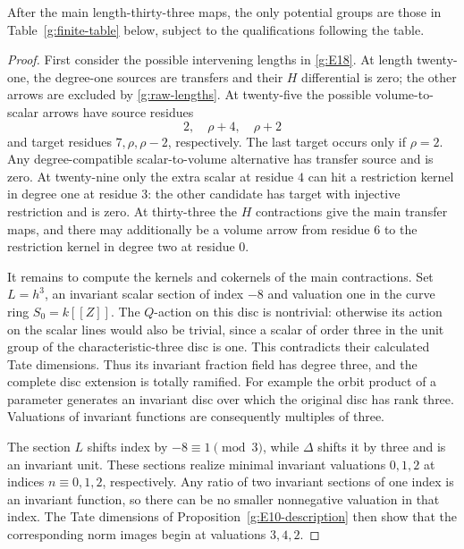 \begin{lemma}\label{g:to33}
After the main length-thirty-three maps, the only potential
groups are those in Table~\ref{g:finite-table} below, subject
to the qualifications following the table.
\end{lemma}

\begin{proof}
First consider the possible intervening lengths in
\eqref{g:E18}.  At length twenty-one, the degree-one sources
are transfers and their $H$ differential is zero; the
other arrows are excluded by \eqref{g:raw-lengths}.
At twenty-five the possible volume-to-scalar arrows have
source residues
\[
 2,\quad\rho+4,\quad\rho+2
\]
and target residues $7,\rho,\rho-2$, respectively.
The last target occurs only if $\rho=2$.  Any
degree-compatible scalar-to-volume alternative has
transfer source and is zero.  At twenty-nine only the
extra scalar at residue $4$ can hit a restriction kernel
in degree one at residue $3$: the other candidate has
target with injective restriction and is zero.  At
thirty-three the $H$ contractions give the main transfer
maps, and there may additionally be a volume arrow from
residue $6$ to the restriction kernel in degree two at
residue $0$.

It remains to compute the kernels and cokernels of the
main contractions.  Set $L=h^3$, an invariant scalar
section of index $-8$ and valuation one in the curve
ring $S_0=k[[Z]]$.  The $Q$-action on this disc is
nontrivial: otherwise its action on the scalar lines
would also be trivial, since a scalar of order three
in the unit group of the characteristic-three disc
is one.  This contradicts their calculated Tate
dimensions.  Thus its invariant fraction field has
degree three, and the complete disc extension is
totally ramified.  For example the orbit product of a
parameter generates an invariant disc over which the
original disc has rank three.  Valuations of invariant
functions are consequently multiples of three.

The section $L$ shifts index by $-8\equiv1\pmod3$,
while $\Delta$ shifts it by three and is an invariant
unit.  These sections realize minimal invariant
valuations $0,1,2$ at indices $n\equiv0,1,2$,
respectively.  Any ratio of two invariant sections of
one index is an invariant function, so there can be no
smaller nonnegative valuation in that index.  The Tate
dimensions of Proposition~\ref{g:E10-description}
then show that the corresponding norm images begin at
valuations $3,4,2$.


\end{proof}
